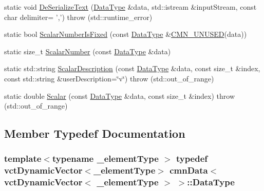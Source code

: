 \begin{DoxyCompactItemize}
\item 
static void \hyperlink{classcmn_data_3_01vct_dynamic_vector_3_01__element_type_01_4_01_4_a69af2b51e1d1a20c56d32fd0deeda766}{De\-Serialize\-Text} (\hyperlink{classcmn_data_3_01vct_dynamic_vector_3_01__element_type_01_4_01_4_a00a493d9c26fcb200ced1375b3500d17}{Data\-Type} \&data, std\-::istream \&input\-Stream, const char delimiter= ',')  throw (std\-::runtime\-\_\-error)
\item 
static bool \hyperlink{classcmn_data_3_01vct_dynamic_vector_3_01__element_type_01_4_01_4_a2d9e5da4edd6045b601d9da21ffb6f61}{Scalar\-Number\-Is\-Fixed} (const \hyperlink{classcmn_data_3_01vct_dynamic_vector_3_01__element_type_01_4_01_4_a00a493d9c26fcb200ced1375b3500d17}{Data\-Type} \&\hyperlink{cmn_portability_8h_a021894e2626935fa2305434b1e893ff6}{C\-M\-N\-\_\-\-U\-N\-U\-S\-E\-D}(data))
\item 
static size\-\_\-t \hyperlink{classcmn_data_3_01vct_dynamic_vector_3_01__element_type_01_4_01_4_a0f95436e4701b5eed4a2c6be1d6bcf70}{Scalar\-Number} (const \hyperlink{classcmn_data_3_01vct_dynamic_vector_3_01__element_type_01_4_01_4_a00a493d9c26fcb200ced1375b3500d17}{Data\-Type} \&data)
\item 
static std\-::string \hyperlink{classcmn_data_3_01vct_dynamic_vector_3_01__element_type_01_4_01_4_a121e53ceebd6cee4395286ab91d66412}{Scalar\-Description} (const \hyperlink{classcmn_data_3_01vct_dynamic_vector_3_01__element_type_01_4_01_4_a00a493d9c26fcb200ced1375b3500d17}{Data\-Type} \&data, const size\-\_\-t \&index, const std\-::string \&user\-Description=\char`\"{}v\char`\"{})  throw (std\-::out\-\_\-of\-\_\-range)
\item 
static double \hyperlink{classcmn_data_3_01vct_dynamic_vector_3_01__element_type_01_4_01_4_a7584fc11f9661a815dc1aaa3d516e59d}{Scalar} (const \hyperlink{classcmn_data_3_01vct_dynamic_vector_3_01__element_type_01_4_01_4_a00a493d9c26fcb200ced1375b3500d17}{Data\-Type} \&data, const size\-\_\-t \&index)  throw (std\-::out\-\_\-of\-\_\-range)
\end{DoxyCompactItemize}


\subsection{Member Typedef Documentation}
\hypertarget{classcmn_data_3_01vct_dynamic_vector_3_01__element_type_01_4_01_4_a00a493d9c26fcb200ced1375b3500d17}{
\subsubsection[{Data\-Type}]{\setlength{\rightskip}{0pt plus 5cm}template$<$typename \-\_\-element\-Type $>$ typedef {\bf vct\-Dynamic\-Vector}$<$\-\_\-element\-Type$>$ {\bf cmn\-Data}$<$ {\bf vct\-Dynamic\-Vector}$<$ \-\_\-element\-Type $>$ $>$\-::{\bf Data\-Type}}}\label{classcmn_data_3_01vct_dynamic_vector_3_01__element_type_01_4_01_4_a00a493d9c26fcb200ced1375b3500d17}


